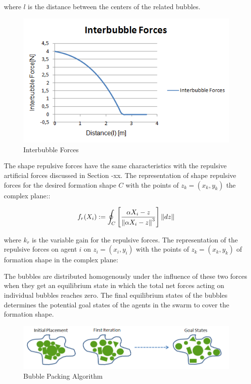 where $l$ is the distance between the centers of the related bubbles. 

\begin{figure}[H]
\caption{Interbubble Forces}
\centering
\includegraphics[scale = 0.70]{interbubble_forces}
\end{figure}
	
The shape repulsive forces have the same characteristics with the repulsive artificial forces discussed in Section -xx. The representation of shape repulsive forces for the desired formation shape $C$ with the points of  $z_k = (x_k,y_k)$ the complex plane::
	
\begin{equation}
f_r(X_i) := \oint_C \left[\frac{\alpha X_i - z}{\left\lVert\alpha X_i - z\right\rVert^3}\right] \left\lVert dz\right\rVert
\end{equation}

where $k_r$ is the variable gain for the repulsive forces. The representation of the repulsive forces on agent $i$ on $z_i = (x_i, y_i)$ with the points of  $z_k = (x_k,y_k)$ of formation shape in the complex plane:
	
The bubbles are distributed homogenously under the influence of these two forces when they get an equilibrium state in which the total net forces acting on individual bubbles reaches zero. The final equilibrium states of the bubbles determines the potential goal states of the agents in the swarm to cover the formation shape. 

\begin{figure}[H]
\caption{Bubble Packing Algorithm}
\centering
\includegraphics[scale = 0.70]{bubble_packing2}
\end{figure}

